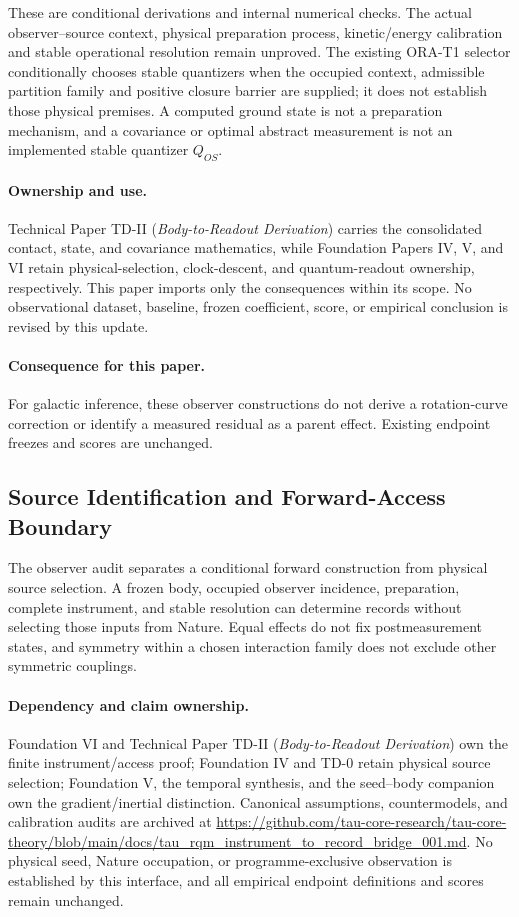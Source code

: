 \documentclass[11pt]{article}
\begin{document}
These are conditional derivations and internal numerical checks. The actual
observer--source context, physical preparation process, kinetic/energy
calibration and stable operational resolution remain unproved. The existing
ORA-T1 selector conditionally chooses stable quantizers when the occupied
context, admissible partition family and positive closure barrier are supplied;
it does not establish those physical premises. A computed ground state is not
a preparation mechanism, and a covariance or optimal abstract measurement is
not an implemented stable quantizer $Q_{OS}$.

\paragraph{Ownership and use.}
Technical Paper TD-II (\emph{Body-to-Readout Derivation}) carries the consolidated
contact, state, and covariance mathematics, while Foundation Papers IV, V, and VI
retain physical-selection, clock-descent, and quantum-readout ownership,
respectively. This paper imports only the consequences within its scope. No
observational dataset, baseline, frozen coefficient, score, or empirical
conclusion is revised by this update.

\paragraph{Consequence for this paper.}
For galactic inference, these observer constructions do not derive a rotation-curve correction or identify a measured residual as a parent effect. Existing endpoint freezes and scores are unchanged.

\subsection{Source Identification and Forward-Access Boundary}
The observer audit separates a conditional forward construction from physical source selection. A frozen body, occupied observer incidence, preparation, complete instrument, and stable resolution can determine records without selecting those inputs from Nature. Equal effects do not fix postmeasurement states, and symmetry within a chosen interaction family does not exclude other symmetric couplings.

\paragraph{Dependency and claim ownership.}
Foundation VI and Technical Paper TD-II (\emph{Body-to-Readout Derivation}) own the finite instrument/access proof; Foundation IV and TD-0 retain physical source selection; Foundation V, the temporal synthesis, and the seed--body companion own the gradient/inertial distinction. Canonical assumptions, countermodels, and calibration audits are archived at \url{https://github.com/tau-core-research/tau-core-theory/blob/main/docs/tau_rqm_instrument_to_record_bridge_001.md}. No physical seed, Nature occupation, or programme-exclusive observation is established by this interface, and all empirical endpoint definitions and scores remain unchanged.
\end{document}
